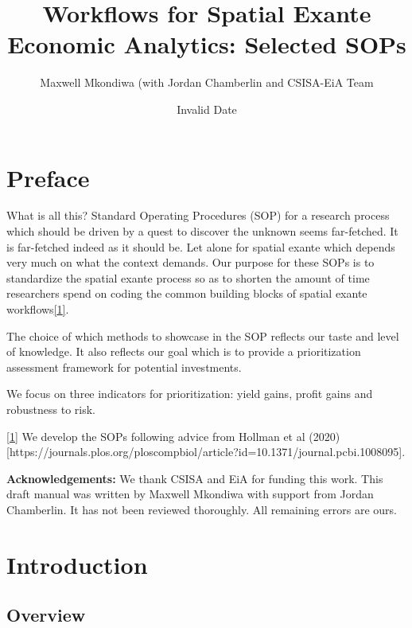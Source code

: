 \documentclass[
  letterpaper,
  DIV=11,
  numbers=noendperiod]{scrreprt}
\title{Workflows for Spatial Exante Economic Analytics: Selected SOPs}
\author{Maxwell Mkondiwa (with Jordan Chamberlin and CSISA-EiA Team}
\date{Invalid Date}
\renewcommand*\contentsname{Table of contents}
\newcommand\contentsname{Table of contents}
\begin{document}
\maketitle

\renewcommand*\contentsname{Table of contents}
{
\hypersetup{linkcolor=}
\setcounter{tocdepth}{2}
\tableofcontents
}

\chapter*{Preface}\label{preface}


What is all this? Standard Operating Procedures (SOP) for a research
process which should be driven by a quest to discover the unknown seems
far-fetched. It is far-fetched indeed as it should be. Let alone for
spatial exante which depends very much on what the context demands. Our
purpose for these SOPs is to standardize the spatial exante process so
as to shorten the amount of time researchers spend on coding the common
building blocks of spatial exante workflows\hyperref[_ftn1]{{[}1{]}}.

The choice of which methods to showcase in the SOP reflects our taste
and level of knowledge. It also reflects our goal which is to provide a
prioritization assessment framework for potential investments.

We focus on three indicators for prioritization: yield gains, profit
gains and robustness to risk.

\hyperref[_ftnref1]{{[}1{]}} We develop the SOPs following advice from
Hollman et al (2020)
{[}https://journals.plos.org/ploscompbiol/article?id=10.1371/journal.pcbi.1008095{]}.

\textbf{Acknowledgements:} We thank CSISA and EiA for funding this work.
This draft manual was written by Maxwell Mkondiwa with support from
Jordan Chamberlin. It has not been reviewed thoroughly. All remaining
errors are ours.


\chapter{Introduction}\label{introduction}

\section{Overview}\label{overview}
\end{document}
